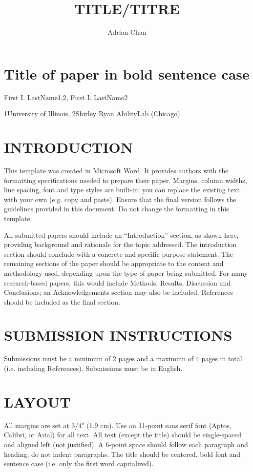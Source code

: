 \documentclass{article}
\title{TITLE/TITRE}
\author{Adrian Chan}
\begin{document}
\maketitle

\section{Title of paper in bold sentence case}

First I. LastName1,2, First I. LastName2

1University of Illinois, 2Shirley Ryan AbilityLab (Chicago)

\section{INTRODUCTION}

This template was created in Microsoft Word. It provides authors with the formatting specifications needed to prepare their paper. Margins, column widths, line spacing, font and type styles are built-in: you can replace the existing text with your own (e.g. copy and paste). Ensure that the final version follows the guidelines provided in this document. Do not change the formatting in this template.

All submitted papers should include an “Introduction” section, as shown here, providing background and rationale for the topic addressed. The introduction section should conclude with a concrete and specific purpose statement. The remaining sections of the paper should be appropriate to the content and methodology used, depending upon the type of paper being submitted. For many research-based papers, this would include Methods, Results, Discussion and Conclusions; an Acknowledgements section may also be included. References should be included as the final section.

\section{SUBMISSION INSTRUCTIONS}

Submissions must be a minimum of 2 pages and a maximum of 4 pages in total (i.e. including References). Submissions must be in English. 

\section{LAYOUT}

All margins are set at 3/4" (1.9 cm). Use an 11-point sans serif font (Aptos, Calibri, or Arial) for all text. All text (except the title) should be single-spaced and aligned left (not justified). A 6-point space should follow each paragraph and heading; do not indent paragraphs. The title should be centered, bold font and sentence case (i.e. only the first word capitalized). 
\end{document}
